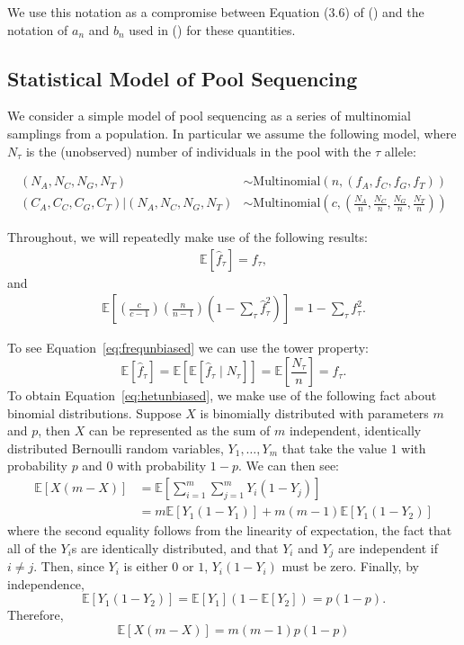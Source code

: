 \documentclass[a4paper,fontsize=9pt,DIV=14]{scrartcl}
\newcommand{\samplesize}{n}
\newcommand{\coverage}{c}
\newcommand{\empfreq}{\widehat{f}}
\newcommand\citeay[1]{\citeauthor{#1} (\citeyear{#1}) \cite{#1}}
\begin{document}
We use this notation as a compromise between Equation (3.6) of \citeay{Hahn2018} and the notation of $a_n$ and $b_n$ used in \citeay{Achaz2008} for these quantities.

\subsection{Statistical Model of Pool Sequencing}

We consider a simple model of pool sequencing as a series of multinomial samplings from a population.  In particular we assume the following model, where $N_\tau$ is the (unobserved) number of individuals in the pool with the $\tau$ allele:

\begin{align*}
(N_A, N_C, N_G, N_T) &\sim \text{Multinomial}\left(\samplesize, (f_A, f_C, f_G, f_T)\right)\\
(C_A, C_C, C_G, C_T) | (N_A, N_C, N_G, N_T) &\sim \text{Multinomial}\left(\coverage, \left(\frac{N_A}{\samplesize}, \frac{N_C}{\samplesize},\frac{N_G}{\samplesize},\frac{N_T}{\samplesize}\right)\right)
\end{align*}

Throughout, we will repeatedly make use of the following results:
\begin{align}
\mathbb{E}\left[\empfreq_\tau\right] = f_\tau, \label{eq:frequnbiased}
\end{align}
and
\begin{align}
\mathbb{E}\left[\left(\frac{\coverage}{\coverage-1}\right)\left(\frac{\samplesize}{\samplesize-1}\right)\left(1-\sum_\tau\empfreq_\tau^2\right)\right] = 1-\sum_\tau f_\tau^2. \label{eq:hetunbiased}
\end{align}

To see Equation~\ref{eq:frequnbiased} we can use the tower property:
\[
\mathbb{E}\left[\empfreq_\tau\right] = \mathbb{E}\left[\mathbb{E}\left[\empfreq_\tau \mid N_\tau \right]\right] = \mathbb{E}\left[\frac{N_\tau}{n}\right] = f_\tau.
\]
To obtain Equation~\ref{eq:hetunbiased}, we make use of the following fact about binomial distributions.  Suppose $X$ is binomially distributed with parameters $m$ and $p$, then $X$ can be represented as the sum of $m$ independent, identically distributed Bernoulli random variables, $Y_1,\ldots,Y_m$ that take the value $1$ with probability $p$ and $0$ with probability $1-p$.  We can then see:
\begin{align*}
\mathbb{E}\left[X(m-X)\right] &= \mathbb{E}\left[\sum_{i=1}^m\sum_{j=1}^mY_i(1-Y_j)\right]\\
&= m\mathbb{E}\left[Y_1(1-Y_1)\right] + m(m-1)\mathbb{E}\left[Y_1(1-Y_2)\right]
\end{align*}
where the second equality follows from the linearity of expectation, the fact that all of the $Y_i$s are identically distributed, and that $Y_i$ and $Y_j$ are independent if $i\ne j$.  Then, since $Y_i$ is either $0$ or $1$, $Y_i(1-Y_i)$ must be zero.  Finally, by independence,
\[
\mathbb{E}\left[Y_1(1-Y_2)\right] = \mathbb{E}\left[Y_1\right]\left(1-\mathbb{E}\left[Y_2\right]\right) = p(1-p).
\]
Therefore,
\[
\mathbb{E}\left[X(m-X)\right]  = m(m-1)p(1-p)
\]
\end{document}
